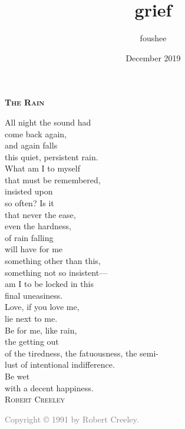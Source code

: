 \documentclass[12pt]{memoir}
\title{grief}
\author{foushee }
\date{December 2019}
\begin{document}
\thispagestyle{empty}
\noindent \textbf{\textsc{\Large The Rain }}
\vspace{18pt}

All night the sound had\\
come back again,\\
and again falls\\
this quiet, persistent rain.\\
 
What am I to myself\\
that must be remembered,\\
insisted upon\\
so often? Is it\\
 
that never the ease,\\
even the hardness,\\
of rain falling\\
will have for me\\
 
something other than this,\\
something not so insistent---\\
am I to be locked in this\\
final uneasiness.\\
 
Love, if you love me,\\
lie next to me.\\
Be for me, like rain,\\
the getting out\\
 
of the tiredness, the fatuousness, the semi-\\
lust of intentional indifference.\\
Be wet\\
with a decent happiness.\\

\vspace{22pt}
\hspace{62pt} \textsc{Robert Creeley}\\
\vfill
\noindent\footnotesize{

\textcolor{gray}{Copyright © 1991 by Robert Creeley.}} 
\end{document}
